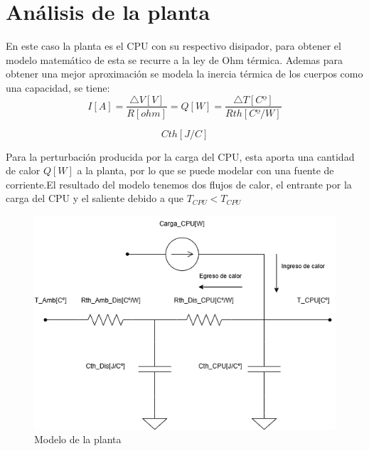 \documentclass[12pt]{article}
\begin{document}
\section{Análisis de la planta}
	 En este caso la planta es el CPU con su respectivo disipador, para obtener el modelo matemático de esta se recurre a la ley de Ohm térmica. Ademas para obtener una mejor aproximación se modela la inercia térmica de los cuerpos como una capacidad, se tiene:
	 \begin{equation}
	 	I[A]=\frac{\bigtriangleup V[V]}{R[ohm]}=Q[W]=\frac{\bigtriangleup T[Cº]}{Rth[Cº/W]}
	 \end{equation}
	 
	 \begin{equation}
	 	Cth[J/C]
	 \end{equation}
	 
	 Para la perturbación producida por la carga del CPU, esta aporta una cantidad de calor $Q[W]$ a la planta, por lo que se puede modelar con una fuente de corriente.El resultado del modelo tenemos dos flujos de calor, el entrante por la carga del CPU y el saliente debido a que $T_{CPU}<T_{CPU}$
	 
	\begin{figure}
		\includegraphics[width=0.9\linewidth]{Imagenes/Modelo_Planta.drawio}
		\caption[Modelo de la planta]{Modelo de la planta}
		\label{fig:modeloplanta}
	\end{figure}
	 
	 
	 
\end{document}
